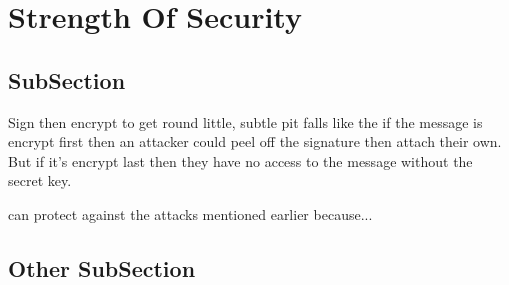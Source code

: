 
\chapter{Strength Of Security}
\label{stre}




\section{SubSection}

Sign then encrypt to get round little, subtle pit falls like the if the message is encrypt first then an attacker could peel off the signature then attach their own. But if it's encrypt last then they have no access to the message without the secret key.

can protect against the attacks mentioned earlier because...

\section{Other SubSection}